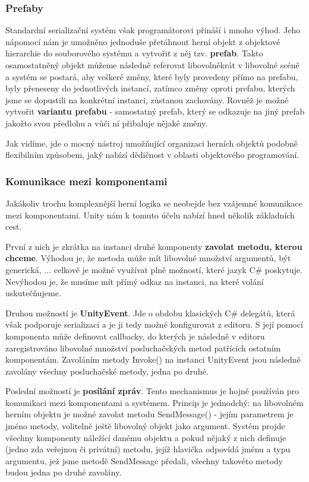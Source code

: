 \subsubsection*{Prefaby}
Standardní serializační systém však programátorovi přináší i mnoho výhod. Jeho nápomocí nám je umožněno jednoduše přetáhnout herní objekt z objektové hierarchie do souborového systému a vytvořit z něj tzv. \textbf{prefab}. Takto osamostatněný objekt můžeme následně referovat libovolněkrát v libovolné scéně a systém se postará, aby veškeré změny, které byly provedeny přímo na prefabu, byly přeneseny do jednotlivých instancí, zatímco změny oproti prefabu, kterých jsme se dopustili na konkrétní instanci, zůstanou zachovány. Rovněž je možné vytvořit \textbf{variantu prefabu} - samostatný prefab, který se odkazuje na jiný prefab jakožto svou předlohu a vůči ní přibaluje nějaké změny. 

Jak vidíme, jde o mocný nástroj umožňující organizaci herních objektů podobně flexibilním způsobem, jaký nabízí dědičnost v oblasti objektového programování. 

\subsubsection*{Komunikace mezi komponentami} \label{communicationBetweenComponentsSubsubsection}

Jakákoliv trochu komplexnější herní logika se neobejde bez vzájemné komunikace mezi komponentami. Unity nám k tomuto účelu nabízí hned několik základních cest.

První z nich je zkrátka na instanci druhé komponenty \textbf{zavolat metodu, kterou chceme}. Výhodou je, že metoda může mít libovolné množství argumentů, být generická, ... celkově je možné využívat plně možností, které jazyk C\# poskytuje. Nevýhodou je, že musíme mít přímý odkaz na instanci, na které volání uskutečňujeme.

Druhou možností je \textbf{UnityEvent}. Jde o obdobu klasických C\# delegátů, která však podporuje serializaci a je ji tedy možné konfigurovat z editoru. S její pomocí komponenta může definovat callbacky, do kterých je následně v editoru zaregistrováno libovolné množství posluchačských metod patřících ostatním komponentám. Zavoláním metody Invoke() na instanci UnityEvent jsou následně zavolány všechny posluchačské metody, jedna po druhé.

Poslední možností je \textbf{posílání zpráv}. Tento mechanismus je hojně používán pro komunikaci mezi komponentami a systémem. Princip je jednodchý: na libovolném herním objektu je možné zavolat metodu SendMessage() - jejím parametrem je jméno metody, volitelně ještě libovolný objekt jako argument. Systém projde všechny komponenty náležící danému objektu a pokud nějaký z nich definuje (jedno zda veřejnou či privátní) metodu, jejíž hlavička odpovídá jménu a typu argumentu, jež jsme metodě SendMessage předali, všechny takovéto metody budou jedna po druhé zavolány.

